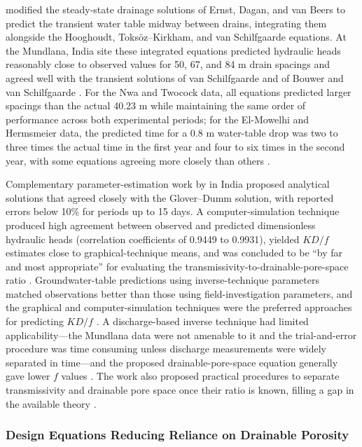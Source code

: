 \textcite{SINGH1992} modified the steady-state drainage solutions of Ernst, Dagan, and van
Beers to predict the transient water table midway between drains, integrating them
alongside the Hooghoudt, Toksöz--Kirkham, and van Schilfgaarde equations. At the Mundlana,
India site these integrated equations predicted hydraulic heads reasonably close to
observed values for 50, 67, and 84 m drain spacings and agreed well with the transient
solutions of van Schilfgaarde and of Bouwer and van Schilfgaarde \parencite{SINGH1992}.
For the Nwa and Twocock data, all equations predicted larger spacings than the actual
40.23 m while maintaining the same order of performance across both experimental periods;
for the El-Mowelhi and Hermsmeier data, the predicted time for a 0.8 m water-table drop
was two to three times the actual time in the first year and four to six times in the
second year, with some equations agreeing more closely than others
\parencite{SINGH1992}.

Complementary parameter-estimation work by \textcite{KUMAR1994} in India proposed
analytical solutions that agreed closely with the Glover--Dumm solution, with reported
errors below 10\% for periods up to 15 days. A computer-simulation technique produced high
agreement between observed and predicted dimensionless hydraulic heads (correlation
coefficients of 0.9449 to 0.9931), yielded $KD/f$ estimates close to graphical-technique
means, and was concluded to be ``by far and most appropriate'' for evaluating the
transmissivity-to-drainable-pore-space ratio \parencite{KUMAR1994}. Groundwater-table
predictions using inverse-technique parameters matched observations better than those
using field-investigation parameters, and the graphical and computer-simulation techniques
were the preferred approaches for predicting $KD/f$ \parencite{KUMAR1994}. A
discharge-based inverse technique had limited applicability---the Mundlana data were not
amenable to it and the trial-and-error procedure was time consuming unless discharge
measurements were widely separated in time---and the proposed drainable-pore-space
equation generally gave lower $f$ values \parencite{KUMAR1994}. The work also proposed
practical procedures to separate transmissivity and drainable pore space once their ratio
is known, filling a gap in the available theory \parencite{KUMAR1994}.

\subsubsection{Design Equations Reducing Reliance on Drainable Porosity}

